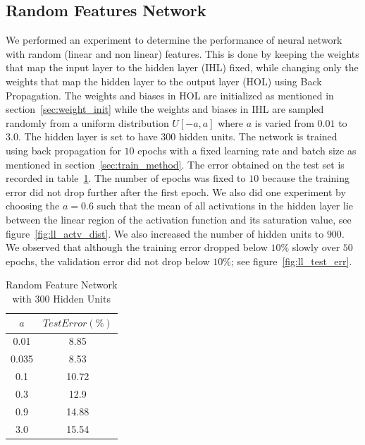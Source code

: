 \documentclass[Proceedings]{ascelike}
\begin{document}
\subsection{Random Features Network} We performed an experiment to determine
the performance of neural network with random (linear and non linear) features.
This is done by keeping the weights that map the input layer to the hidden
layer (IHL) fixed, while changing only the weights that map the hidden layer to
the output layer (HOL) using Back Propagation. The weights and biases in HOL are
initialized as mentioned in section~\ref{sec:weight_init} while the weights and
biases in IHL are sampled randomly from a uniform distribution $U[-a, a]$ where
$a$ is varied from $0.01$ to $3.0$. The hidden layer is set to have $300$
hidden units. The network is trained using back propagation for $10$ epochs
with a fixed learning rate and batch size as mentioned in
section~\ref{sec:train_method}. The error obtained on the test set is recorded
in table~\ref{tab:terror}. The number of epochs was fixed to $10$ because the
training error did not drop further after the first epoch. We also did one
experiment by choosing the $a=0.6$ such that the mean of all activations
in the hidden layer lie between the linear region of the activation function
and its saturation value, see figure~\ref{fig:ll_actv_dist}. We also increased
the number of hidden units to $900$. We observed that although the training
error dropped below $10\%$ slowly over $50$ epochs, the validation error did
not drop below $10\%$; see figure~\ref{fig:ll_test_err}.

\begin{table}[H] \centering \begin{tabular}{|c||c|} \hline $a$&$Test Error (\%)$\\
\hline \hline 0.01&8.85\\ 0.035&8.53\\ 0.1&10.72\\ 0.3&12.9\\
0.9&14.88\\ 3.0&15.54\\ \hline \end{tabular} \caption{Random Feature Network
with 300 Hidden Units} \label{tab:terror} \end{table}
\end{document}
